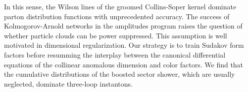In this sense, the Wilson lines of the groomed Collins-Soper kernel
dominate parton distribution functions with unprecedented accuracy. The
success of Kolmogorov-Arnold networks in the amplitudes program raises
the question of whether particle clouds can be power suppressed. This
assumption is well motivated in dimensional regularization. Our strategy
is to train Sudakov form factors before resumming the interplay between
the canonical differential equations of the collinear anomalous
dimension and color factors. We find that the cumulative distributions
of the boosted sector shower, which are usually neglected, dominate
three-loop instantons.

